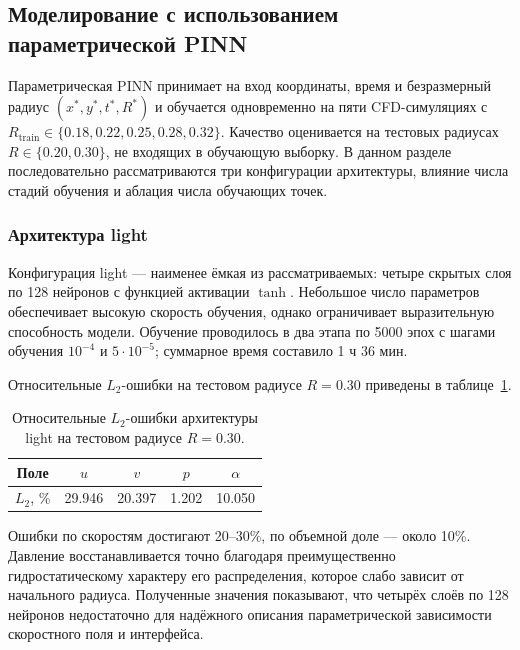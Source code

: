 \documentclass[12pt,a4paper]{article}
\begin{document}
\subsection{Моделирование с использованием параметрической PINN}

Параметрическая PINN принимает на вход координаты, время и безразмерный
радиус \((x^*,y^*,t^*,R^*)\) и обучается одновременно на пяти CFD-симуляциях
с \(R_{\mathrm{train}}\in\{0.18,0.22,0.25,0.28,0.32\}\). Качество оценивается
на тестовых радиусах \(R\in\{0.20,0.30\}\), не входящих в обучающую выборку.
В данном разделе последовательно рассматриваются три конфигурации архитектуры,
влияние числа стадий обучения и аблация числа обучающих точек.

\subsubsection{Архитектура light}

Конфигурация light --- наименее ёмкая из рассматриваемых: четыре скрытых
слоя по 128 нейронов с функцией активации \(\tanh\). Небольшое число
параметров обеспечивает высокую скорость обучения, однако ограничивает
выразительную способность модели. Обучение проводилось в два этапа по 5000
эпох с шагами обучения \(10^{-4}\) и \(5\cdot10^{-5}\); суммарное время
составило 1 ч 36 мин.

Относительные \(L_2\)-ошибки на тестовом радиусе \(R=0.30\) приведены в
таблице~\ref{tab:light_errors}.

\begin{table}[H]
    \centering
    \begin{tabular}{c|cccc}
        \hline
        Поле & \(u\) & \(v\) & \(p\) & \(\alpha\) \\
        \hline
        \(L_2\), \% & 29.946 & 20.397 & 1.202 & 10.050 \\
        \hline
    \end{tabular}
    \caption{Относительные \(L_2\)-ошибки архитектуры light на тестовом радиусе \(R=0.30\).}
    \label{tab:light_errors}
\end{table}

Ошибки по скоростям достигают 20--30\%, по объемной доле --- около 10\%.
Давление восстанавливается точно благодаря преимущественно гидростатическому
характеру его распределения, которое слабо зависит от начального радиуса.
Полученные значения показывают, что четырёх слоёв по 128 нейронов недостаточно
для надёжного описания параметрической зависимости скоростного поля и
интерфейса.
\end{document}

